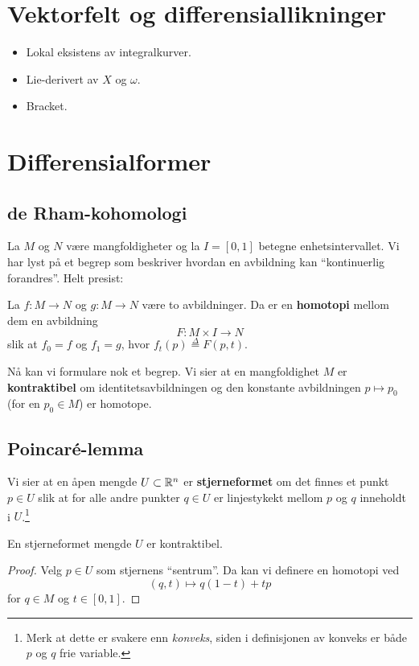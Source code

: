 \documentclass[11pt, english]{article}
\begin{document}
\section{Vektorfelt og differensiallikninger}

\begin{itemize}
\item Lokal eksistens av integralkurver.
\item Lie-derivert av $X$ og $\omega$.
\item Bracket.
\end{itemize}


\section{Differensialformer}

\subsection{de Rham-kohomologi}


La $M$ og $N$ være mangfoldigheter og la $I=[0,1]$ betegne enhetsintervallet. Vi har lyst på et begrep som beskriver hvordan en avbildning kan ``kontinuerlig forandres''. Helt presist:
\begin{defi}
La $f:M \to N$ og $g:M \to N$ være to avbildninger. Da er en \textbf{homotopi} mellom dem en avbildning
$$
F:M \times I \to N
$$
slik at $f_0 = f$ og $f_1=g$, hvor $f_t(p) \stackrel{\Delta}{=} F(p,t)$.
\end{defi}

Nå kan vi formulare nok et begrep. Vi sier at en mangfoldighet $M$ er \textbf{kontraktibel} om identitetsavbildningen og den konstante avbildningen $p \mapsto p_0$ (for en $p_0 \in M$) er homotope. 


\subsection{Poincaré-lemma}

Vi sier at en åpen mengde $U \subset \mathbb{R}^n$ er \textbf{stjerneformet} om det finnes et punkt $p \in U$ slik at for alle andre punkter $q \in U$ er linjestykekt mellom $p$ og $q$ inneholdt i $U$.\footnote{Merk at dette er svakere enn \emph{konveks}, siden i definisjonen av konveks er både $p$ og $q$ frie variable.}

\begin{lemma}
 En stjerneformet mengde $U$ er kontraktibel.
\end{lemma}
\begin{proof}
Velg $p \in U$ som stjernens ``sentrum''. Da kan vi definere en homotopi ved
$$
(q,t) \mapsto q(1-t) + tp
$$
for $q \in M$ og $t \in [0,1]$.
\end{proof}
\end{document}
